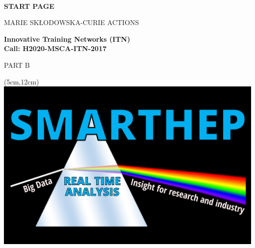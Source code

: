 \documentclass[11pt,a4paper]{article}
\def\acronym{SMARTHEP\xspace}
\begin{document}
\begin{center}

\mbox{ }\\[1ex
\vspace{1cm}]

{\LARGE\bf START PAGE}

\vspace{2.5cm}


{\LARGE MARIE SK\L ODOWSKA-CURIE ACTIONS}\\[2ex]

\vspace{2cm}

{\LARGE\bf Innovative Training Networks (ITN)\\
Call: H2020-MSCA-ITN-2017}\\[2ex]

\vspace{1.0cm}

{\LARGE PART B}

\begin{center}
\begin{textblock*}{12cm}(5cm,12cm)
	\centering 
	\includegraphics[width=\textwidth]{figs/SMARTHEP_Logo}
\end{textblock*}    
\end{center}

\vspace{9.0cm}



\end{center}
\end{document}
